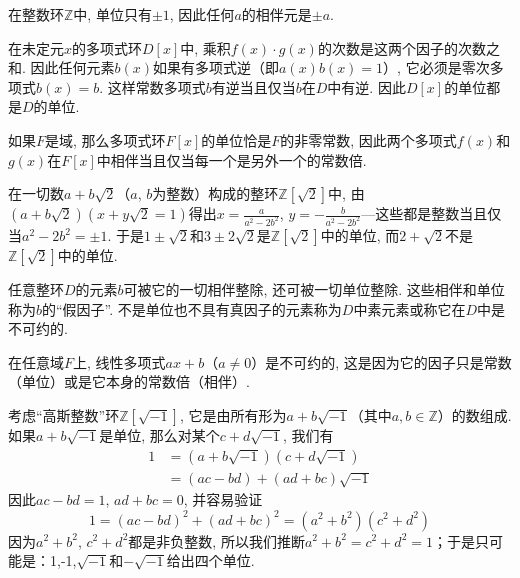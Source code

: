 \begin{example}\label{exam001030602}
在整数环$\mathbb{Z}$中, 单位只有$\pm{1}$, 因此任何$a$的相伴元是$\pm{a}$. 
\end{example}

\begin{example}\label{exam001030603}
在未定元$x$的多项式环$D[x]$中, 乘积$f(x) \cdot g(x)$的次数是这两个因子的次数之和. 因此任何元素$b(x)$如果有多项式逆（即$a(x)b(x)=1$）, 它必须是零次多项式$b(x)=b$. 这样常数多项式$b$有逆当且仅当$b$在$D$中有逆. 因此$D[x]$的单位都是$D$的单位. 

如果$F$是域, 那么多项式环$F[x]$的单位恰是$F$的非零常数, 因此两个多项式$f(x)$和$g(x)$在$F[x]$中相伴当且仅当每一个是另外一个的常数倍. 
\end{example}

\begin{example}\label{exam001030604}
在一切数$a + b\sqrt{2}$（$a$, $b$为整数）构成的整环$\mathbb{Z}[\sqrt{2}]$中, 由$(a+b\sqrt{2})(x+y\sqrt{2}=1)$得出$x = \frac{a}{a^2-2b^2}$, $y = -\frac{b}{a^2-2b^2}$---这些都是整数当且仅当$a^2-2b^2=\pm{1}$. 于是$1\pm{}\sqrt{2}$和$3 \pm 2\sqrt{2}$是$\mathbb{Z}[\sqrt{2}]$中的单位, 而$2 + \sqrt{2}$不是$\mathbb{Z}[\sqrt{2}]$中的单位. 
\end{example}

任意整环$D$的元素$b$可被它的一切相伴整除, 还可被一切单位整除. 这些相伴和单位称为$b$的“假因子”. 不是单位也不具有真因子的元素称为$D$中素元素或称它在$D$中是不可约的. 

\begin{example}\label{exam001030605}
在任意域$F$上, 线性多项式$ax+b$（$a \neq 0$）是不可约的, 这是因为它的因子只是常数（单位）或是它本身的常数倍（相伴）. 
\end{example}

\begin{example}\label{exam001030606}
考虑“高斯整数”环$\mathbb{Z}[\sqrt{-1}]$, 它是由所有形为$a + b\sqrt{-1}$（其中$a, b \in \mathbb{Z}$）的数组成. 如果$a + b\sqrt{-1}$是单位, 那么对某个$c + d\sqrt{-1}$, 我们有
\[
\begin{aligned}
1 &= (a + b\sqrt{-1})(c+d\sqrt{-1}) \\
&=(ac - bd) + (ad + bc)\sqrt{-1}
\end{aligned}
\]
因此$ac-bd = 1$, $ad+bc = 0$, 并容易验证
\[
1 = (ac-bd)^2 + (ad+bc)^2 = (a^2+b^2)(c^2+d^2)
\]
因为$a^2+b^2$, $c^2+d^2$都是非负整数, 所以我们推断$a^2+b^2=c^2+d^2=1$；于是只可能是：1,-1,$\sqrt{-1}$和$-\sqrt{-1}$给出四个单位. 
\end{example}

